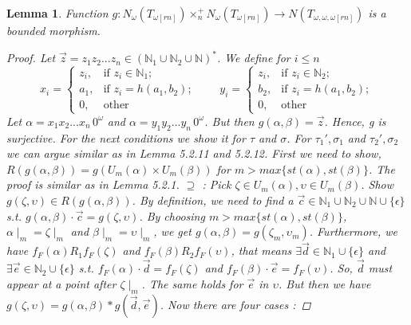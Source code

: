 \documentclass[12pt, a4paper]{scrartcl}
\newtheorem{lemma}[definition]{Lemma}
\begin{document}
    \begin{lemma}
        Function $g : N_\omega(T_{\omega[rn]}) \times^+_n N_\omega(T_{\omega[rn]}) \rightarrow N(T_{\omega,\omega,\omega[rn]})$ is a bounded morphism.
        
        \begin{proof}
            Let $\vec{z} = z_1z_2...z_n \in (\mathbb{N}_{1} \cup \mathbb{N}_{2} \cup \mathbb{N})^*$. We define for $i \leq n $
        \[
            x_i = 
            \begin{cases}
            z_i, & \text{if } z_i \in \mathbb{N}_{1}; \\
            a_1, & \text{if } z_i = h(a_1,b_2); \\
            0,   & \text{other}
            \end{cases}
            \qquad
            y_i = 
            \begin{cases}
            z_i, & \text{if } z_i \in \mathbb{N}_{2}; \\
            b_2, & \text{if } z_i = h(a_1,b_2); \\
            0,   & \text{other } 
            \end{cases}
        \] 
        \newline
        Let $\alpha = x_1x_2...x_n \, 0^\omega$ and $\alpha = y_1y_2...y_n \, 0^\omega$. But then $g(\alpha,\beta) = \vec{z}$. Hence, g is surjective.
        For the next conditions we show it for $\tau$ and $\sigma$. For $\tau_1', \sigma_1$ and $\tau_2', \sigma_2$ we can argue similar as in Lemma 5.2.11 and 5.2.12.\newline
        First we need to show, $R(g(\alpha,\beta)) = g(U_m(\alpha) \times U_m(\beta))$ for $m > max\{st(\alpha), st(\beta)\}$.
        The proof is similar as in Lemma 5.2.1. \newline
        $\supseteq$ : Pick $\zeta \in U_m(\alpha), \upsilon \in U_m(\beta)$. Show $g(\zeta, \upsilon) \in R(g(\alpha,\beta))$. By definition, we need to find a $\vec{c} \in \mathbb{N}_1 \cup \mathbb{N}_2 \cup \mathbb{N} \cup \{\epsilon\}$ s.t. $g(\alpha,\beta) \cdot \vec{c} = g(\zeta, \upsilon)$.
        By choosing $m> max\{st(\alpha),st(\beta)\}$, $\alpha \mid_m = \zeta \mid_m$ and $\beta \mid_m = \upsilon \mid_m$, we get $g(\alpha,\beta) = g(\zeta_m, \upsilon_m)$. Furthermore, we have $f_F(\alpha)R_1f_F(\zeta)$ and $f_F(\beta)R_2f_F(\upsilon)$, that means $\exists \vec{d} \in \mathbb{N}_1 \cup \{\epsilon\}$ and $\exists \vec{e} \in \mathbb{N}_2 \cup \{\epsilon\}$ s.t.
        $f_F(\alpha) \cdot \vec{d} = f_F(\zeta)$ and $f_F(\beta) \cdot \vec{e} = f_F(\upsilon)$. So, $\vec{d}$ must appear at a point after $\zeta \mid_m$. The same holds for $\vec{e}$ in $\upsilon$. But then we have $g(\zeta, \upsilon) = g(\alpha,\beta) * g(\vec{d}, \vec{e})$. Now there are four cases :

\end{proof}
\end{lemma}
\end{document}
